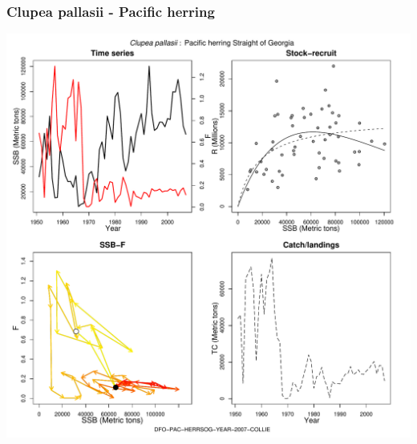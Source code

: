 \subsubsection{Clupea pallasii - Pacific herring}
\begin{center}
\includegraphics[width=1.2\textwidth]{../R/figures/DFO-PAC-HERRSOG-YEAR-2007-COLLIE.pdf}
\end{center}

